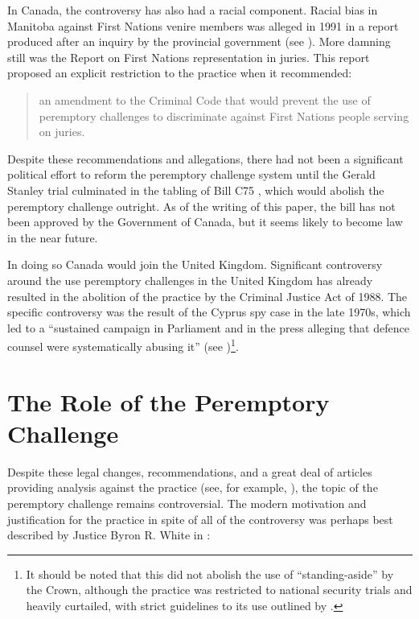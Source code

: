 In Canada, the controversy has also had a racial component. Racial bias in Manitoba against First Nations venire members was
alleged in 1991 in a report produced after an inquiry by the provincial government (see \cite{goodfirststep}). More damning still
was the \citeauthor{iacobuccireport} Report on First Nations representation in juries. This report proposed an explicit
restriction to the practice when it recommended:

\begin{quote}
  \centering
  an amendment to the Criminal Code that would prevent the use of peremptory challenges to discriminate against First Nations
  people serving on juries.
\end{quote}

Despite these recommendations and allegations, there had not been a significant political effort to reform the peremptory
challenge system until the Gerald Stanley trial culminated in the tabling of Bill C75 \cite{c75legisinfo}, which would abolish the
peremptory challenge outright. As of the writing of this paper, the bill has not been approved by the Government of Canada, but it
seems likely to become law in the near future.

In doing so Canada would join the United Kingdom. Significant controversy around the use peremptory challenges in the United
Kingdom has already resulted in the abolition of the practice by the Criminal Justice Act of 1988. The specific controversy was
the result of the Cyprus spy case in the late 1970s, which led to a ``sustained campaign in Parliament and in the press alleging
that defence counsel were systematically abusing it'' (see \cite{hoffman1997})\footnote{It should be noted that this did not
  abolish the use of ``standing-aside'' by the Crown, although the practice was restricted to national security trials and heavily
  curtailed, with strict guidelines to its use outlined by \cite{attgenguide}.}.

\section{The Role of the Peremptory Challenge} \label{sec:roleper}

Despite these legal changes, recommendations, and a great deal of articles providing analysis against the practice (see, for
example, \cite{hoffman1997}), the topic of the peremptory challenge remains controversial. The modern motivation and justification
for the practice in spite of all of the controversy was perhaps best described by Justice Byron R. White in \cite{swainvalabama}:

